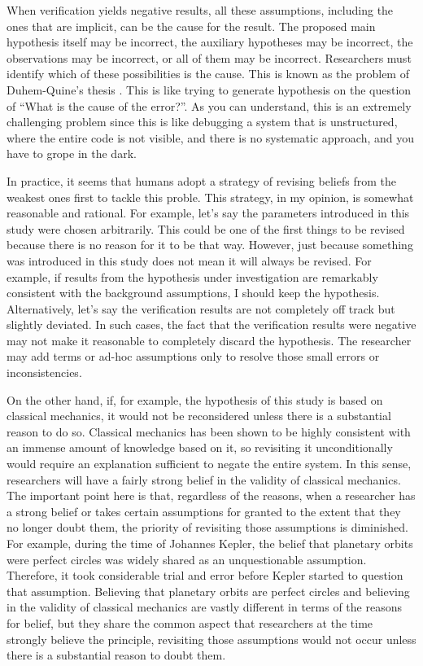 When verification yields negative results, all these assumptions, including the ones that are implicit, can be the cause for the result. The proposed main hypothesis itself may be incorrect, the auxiliary hypotheses may be incorrect, the observations may be incorrect, or all of them may be incorrect. Researchers must identify which of these possibilities is the cause. This is known as the problem of Duhem-Quine's thesis \cite{sep-scientific-underdetermination}. This is like trying to generate hypothesis on the question of ``What is the cause of the error?''. As you can understand, this is an extremely challenging problem since this is like debugging a system that is unstructured, where the entire code is not visible, and there is no systematic approach, and you have to grope in the dark. 

In practice, it seems that humans adopt a strategy of revising beliefs from the weakest ones first to tackle this proble. This strategy, in my opinion, is somewhat reasonable and rational. For example, let's say the parameters introduced in this study were chosen arbitrarily. This could be one of the first things to be revised because there is no reason for it to be that way. However, just because something was introduced in this study does not mean it will always be revised. For example, if results from the hypothesis under investigation are remarkably consistent with the background assumptions, I should keep the hypothesis. Alternatively, let's say the verification results are not completely off track but slightly deviated. In such cases, the fact that the verification results were negative may not make it reasonable to completely discard the hypothesis. The researcher may add terms or ad-hoc assumptions only to resolve those small errors or inconsistencies.

On the other hand, if, for example, the hypothesis of this study is based on classical mechanics, it would not be reconsidered unless there is a substantial reason to do so. Classical mechanics has been shown to be highly consistent with an immense amount of knowledge based on it, so revisiting it unconditionally would require an explanation sufficient to negate the entire system. In this sense, researchers will have a fairly strong belief in the validity of classical mechanics. The important point here is that, regardless of the reasons, when a researcher has a strong belief or takes certain assumptions for granted to the extent that they no longer doubt them, the priority of revisiting those assumptions is diminished. For example, during the time of Johannes Kepler, the belief that planetary orbits were perfect circles was widely shared as an unquestionable assumption. Therefore, it took considerable trial and error before Kepler started to question that assumption. Believing that planetary orbits are perfect circles and believing in the validity of classical mechanics are vastly different in terms of the reasons for belief, but they share the common aspect that researchers at the time strongly believe the principle, revisiting those assumptions would not occur unless there is a substantial reason to doubt them.

